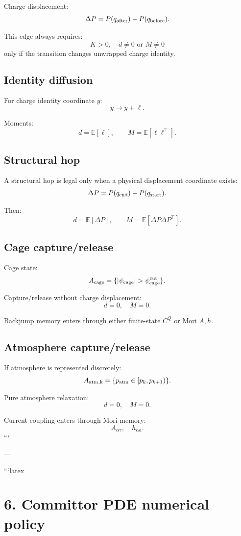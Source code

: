 Charge displacement:
\[
\Delta P=P(q_{\rm after})-P(q_{\rm before}).
\]

This edge always requires:
\[
K>0,\quad d\ne0\text{ or }M\ne0
\]
only if the transition changes unwrapped charge identity.

\subsection{Identity diffusion}

For charge identity coordinate \(y\):
\[
y\to y+\ell.
\]

Moments:
\[
d=\mathbb E[\ell],
\qquad
M=\mathbb E[\ell\ell^\top].
\]

\subsection{Structural hop}

A structural hop is legal only when a physical displacement coordinate exists:
\[
\Delta P=P(q_{\rm end})-P(q_{\rm start}).
\]

Then:
\[
d=\mathbb E[\Delta P],
\qquad
M=\mathbb E[\Delta P\Delta P^\top].
\]

\subsection{Cage capture/release}

Cage state:
\[
A_{\rm cage}
=
\{|\psi_{\rm cage}|>\psi_{\rm cage}^{\rm cut}\}.
\]

Capture/release without charge displacement:
\[
d=0,\quad M=0.
\]

Backjump memory enters through either finite-state \(C^Q\) or Mori \(A,h\).

\subsection{Atmosphere capture/release}

If atmosphere is represented discretely:
\[
A_{\rm atm,k}=\{p_{\rm atm}\in[p_k,p_{k+1})\}.
\]

Pure atmosphere relaxation:
\[
d=0,\quad M=0.
\]

Current coupling enters through Mori memory:
\[
A_{\alpha\gamma},\quad h_{\alpha a}.
\]
```

---

```latex
\section{6. Committor PDE numerical policy}

